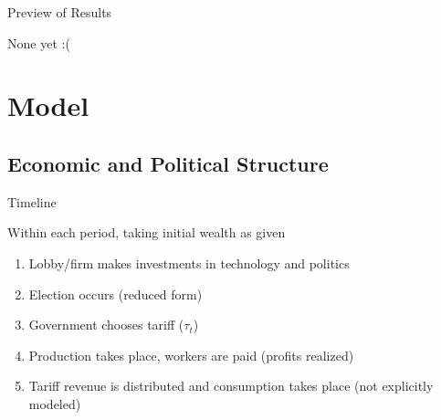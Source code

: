 \documentclass[handout]{beamer}
\begin{document}

 
\begin{frame}{Preview of Results}

\pause
None yet :(


\end{frame}





\section{Model}
\subsection{Economic and Political Structure}
\begin{frame}{Timeline}
\pause

Within each period, taking initial wealth as given
\pause
\begin{enumerate}[<+->]
	\item Lobby/firm makes investments in technology and politics
	\item Election occurs (reduced form)
	\item Government chooses tariff ($\tau_t$)
	\item Production takes place, workers are paid (profits realized)
	\item Tariff revenue is distributed and consumption takes place (not explicitly modeled)
\end{enumerate}
\end{frame}
\end{document}
